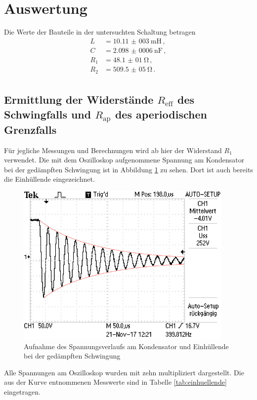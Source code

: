 \section{Auswertung}
\label{sec:Auswertung}
Die Werte der Bauteile in der untersuchten Schaltung betragen
\begin{align*}
  L &= \SI{10,11(003)}{\milli\henry}\,, \\
  C &= \SI{2,098(0006)}{\nano\farad}\,, \\
  R_1 &= \SI{48,1(01)}{\ohm}\,, \\
  R_2 &= \SI{509,5(05)}{\ohm}\,. \\
\end{align*}
\subsection{Ermittlung der Widerstände $R_\text{eff}$ des Schwingfalls und $R_\text{ap}$ des aperiodischen Grenzfalls}
Für jegliche Messungen und Berechnungen wird ab hier der Widerstand $R_1$ verwendet.
Die mit dem Oszilloskop aufgenommene Spannung am Kondensator bei der gedämpften
Schwingung ist in Abbildung \ref{fig:einhuellende} zu sehen. Dort ist auch
bereits die Einhüllende eingezeichnet.

\begin{figure}
  \centering
  \includegraphics[width=300pt]{data/gedaempfte_schwingung2.JPG}
  \caption{Aufnahme des Spannungsverlaufs am Kondensator und Einhüllende bei der
  gedämpften Schwingung}
  \label{fig:einhuellende}
\end{figure}

Alle Spannungen am Oszilloskop wurden mit zehn multipliziert dargestellt. Die
aus der Kurve entnommenen Messwerte sind in Tabelle \ref{tab:einhuellende} eingetragen.

